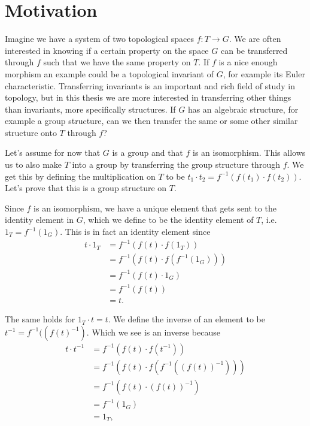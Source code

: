 

\section{Motivation}

Imagine we have a system of two topological spaces $f:T\longrightarrow G$. We are often interested in knowing if a certain property on the space $G$ can be transferred through $f$ such that we have the same property on $T$. If $f$ is a nice enough morphism an example could be a topological invariant of $G$, for example its Euler characteristic. Transferring invariants is an important and rich field of study in topology, but in this thesis we are more interested in transferring other things than invariants, more specifically structures. If $G$ has an algebraic structure, for example a group structure, can we then transfer the same or some other similar structure onto $T$ through $f$?

Let's assume for now that $G$ is a group and that $f$ is an isomorphism. This allows us to also make $T$ into a group by transferring the group structure through $f$. We get this by defining the multiplication on $T$ to be $t_1\cdot t_2 = f^{-1}(f(t_1)\cdot f(t_2))$. Let's prove that this is a group structure on $ T$. 

Since $ f$ is an isomorphism, we have a unique element that gets sent to the identity element in $ G$, which we define to be the identity element of $ T$, i.e. $ 1_T = f^{-1}(1_G)$. This is in fact an identity element since
\begin{align*} 
t\cdot 1_T &= f^{-1}(f(t)\cdot f(1_T)) \\ 
&= f^{-1}(f(t)\cdot f(f^{-1}(1_G))) \\ 
&= f^{-1}(f(t)\cdot 1_G) \\ 
&= f^{-1}(f(t)) \\ 
&= t . 
\end{align*}

 
The same holds for $ 1_T\cdot t = t$. We define the inverse of an element to be $ t^{-1} = f^{-1}((f(t)^{-1})$. Which we see is an inverse because
\begin{align*} 
t\cdot t^{-1} 
&= f^{-1}(f(t)\cdot f(t^{-1})) \\ 
&= f^{-1}(f(t)\cdot f(f^{-1}((f(t))^{-1}))) \\ 
&= f^{-1}(f(t)\cdot (f(t))^{-1}) \\ 
&= f^{-1}(1_G) \\ 
&= 1_T, 
\end{align*}


